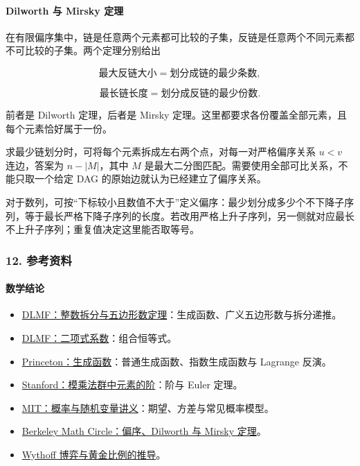 \hypertarget{dilworth-ux4e0e-mirsky-ux5b9aux7406}{%
\paragraph{Dilworth 与 Mirsky 定理}\label{dilworth-ux4e0e-mirsky-ux5b9aux7406}}

在有限偏序集中，链是任意两个元素都可比较的子集，反链是任意两个不同元素都不可比较的子集。两个定理分别给出

\[
\text{最大反链大小}=\text{划分成链的最少条数},
\]

\[
\text{最长链长度}=\text{划分成反链的最少份数}.
\]

前者是 Dilworth 定理，后者是 Mirsky 定理。这里都要求各份覆盖全部元素，且每个元素恰好属于一份。

求最少链划分时，可将每个元素拆成左右两个点，对每一对严格偏序关系 \(u<v\) 连边，答案为 \(n-|M|\)，其中 \(M\) 是最大二分图匹配。需要使用全部可比关系，不能只取一个给定 DAG 的原始边就认为已经建立了偏序关系。

对于数列，可按``下标较小且数值不大于''定义偏序：最少划分成多少个不下降子序列，等于最长严格下降子序列的长度。若改用严格上升子序列，另一侧就对应最长不上升子序列；重复值决定这里能否取等号。

\hypertarget{ux53c2ux8003ux8d44ux6599}{%
\subsubsection{12. 参考资料}\label{ux53c2ux8003ux8d44ux6599}}

\hypertarget{ux6570ux5b66ux7ed3ux8bba}{%
\paragraph{数学结论}\label{ux6570ux5b66ux7ed3ux8bba}}

\begin{itemize}
\tightlist
\item
  \href{https://dlmf.nist.gov/27.14}{DLMF：整数拆分与五边形数定理}：生成函数、广义五边形数与拆分递推。
\item
  \href{https://dlmf.nist.gov/26.3}{DLMF：二项式系数}：组合恒等式。
\item
  \href{https://aofa.cs.princeton.edu/30gf/}{Princeton：生成函数}：普通生成函数、指数生成函数与 Lagrange 反演。
\item
  \href{https://crypto.stanford.edu/pbc/notes/numbertheory/order.html}{Stanford：模乘法群中元素的阶}：阶与 Euler 定理。
\item
  \href{https://ocw.mit.edu/courses/18-600-probability-and-random-variables-fall-2019/pages/lecture-notes/}{MIT：概率与随机变量讲义}：期望、方差与常见概率模型。
\item
  \href{https://mathcircle.berkeley.edu/sites/default/files/handouts/2019/BMC-mashup-debruijn-order-dilworth-hall.pdf}{Berkeley Math Circle：偏序、Dilworth 与 Mirsky 定理}。
\item
  \href{https://arxiv.org/abs/2310.07735}{Wythoff 博弈与黄金比例的推导}。
\end{itemize}

